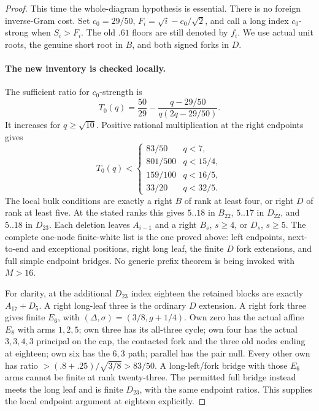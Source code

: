 \documentclass[11pt]{article}
\theoremstyle{definition}
\theoremstyle{remark}
\begin{document}
\begin{proof}
This time the whole-diagram hypothesis is essential. There is no
foreign inverse-Gram cost. Set $c_0=29/50$, $F_i=\sqrt i-c_0/\sqrt2$,
and call a long index $c_0$-strong when $S_i>F_i$. The old $.61$
floors are still denoted by $f_i$. We use actual unit roots, the
genuine short root in $B$, and both signed forks in $D$.

\paragraph{The new inventory is checked locally.}
The sufficient ratio for $c_0$-strength is
\[
 T_0(q)={\frac{50}{29}}-{\frac{q-29/50}{ q(2q-29/50)}}.
\]
It increases for $q\ge\sqrt{10}$. Positive rational multiplication
at the right endpoints gives
\[
 T_0(q)<\begin{cases}
 83/50&q<7,\\801/500&q<15/4,\\159/100&q<16/5,\\33/20&q<32/5.
 \end{cases}
\]
The local bulk conditions are exactly a right $B$ of rank at least
four, or right $D$ of rank at least five. At the stated ranks this
gives $5..18$ in $B_{22}$, $5..17$ in
$D_{22}$, and $5..18$ in $D_{23}$. Each deletion leaves $A_{i-1}$
and a right $B_s$, $s\ge4$, or $D_s$, $s\ge5$. The complete
one-node finite-white list is the one proved above: left endpoints,
next-to-end and exceptional positions, right long leaf, the finite
$D$ fork extensions, and full simple endpoint bridges. No generic
prefix theorem is being invoked with $M>16$.

For clarity, at the additional $D_{23}$ index eighteen the retained
blocks are exactly $A_{17}+D_5$. A right long-leaf three is the
ordinary $D$ extension. A right fork three gives finite $E_6$,
with $(\Delta,\sigma)=(3/8,g+1/4)$. Own zero has the actual
affine $E_8$ with arms $1,2,5$; own three has its all-three cycle;
own four has the actual $3,3,4,3$ principal on the cap, the
contacted fork and the three old nodes ending at eighteen;
own six has the $6,3$ path; parallel has the pair null.
Every other own has ratio $>(.8+.25)/\sqrt{3/8}>83/50$.
A long-left/fork bridge with those $E_6$ arms cannot be finite at
rank twenty-three. The permitted full bridge instead meets the
long leaf and is finite $D_{23}$, with the same endpoint ratios.
This supplies the local endpoint argument at eighteen explicitly.


\end{proof}
\end{document}
